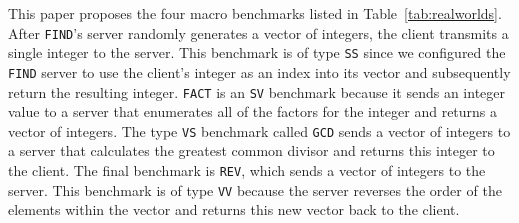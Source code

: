 \documentclass{sig-alternate}
\begin{document}






This paper proposes the four macro benchmarks listed in
Table~\ref{tab:realworlds}.  After \texttt{FIND}'s server randomly
generates a vector of integers, the client transmits a single integer
to the server.  This benchmark is of type {\tt SS} since we configured
the {\tt FIND} server to use the client's integer as an index into its
vector and subsequently return the resulting integer.  {\tt FACT} is
an {\tt SV} benchmark because it sends an integer value to a server
that enumerates all of the factors for the integer and returns a
vector of integers.  The type {\tt VS} benchmark called {\tt GCD}
sends a vector of integers to a server that calculates the greatest
common divisor and returns this integer to the client.  The final
benchmark is \texttt{REV}, which sends a vector of integers to the
server.  This benchmark is of type {\tt VV} because the server
reverses the order of the elements within the vector and returns this
new vector back to the client.
\end{document}

